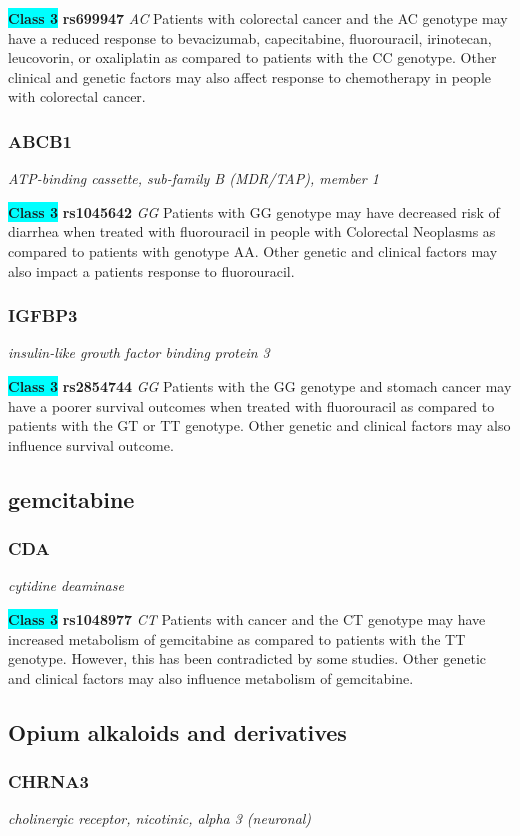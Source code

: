 \documentclass{report}
\begin{document}
\textbf{\colorbox{cyan} {Class 3}} \textbf{ rs699947 } \textit{ AC }
Patients with colorectal cancer and the AC genotype may have a reduced response to bevacizumab, capecitabine, fluorouracil, irinotecan, leucovorin, or oxaliplatin as compared to patients with the CC genotype. Other clinical and genetic factors may also affect response to chemotherapy in people with colorectal cancer.\newline\subsubsection{ ABCB1 }
\textit{ ATP-binding cassette, sub-family B (MDR/TAP), member 1 }

\textbf{\colorbox{cyan} {Class 3}} \textbf{ rs1045642 } \textit{ GG }
Patients with GG genotype may have decreased risk of diarrhea when treated with fluorouracil in people with Colorectal Neoplasms as compared to patients with genotype AA. Other genetic and clinical factors may also impact a patients response to fluorouracil.\newline\subsubsection{ IGFBP3 }
\textit{ insulin-like growth factor binding protein 3 }

\textbf{\colorbox{cyan} {Class 3}} \textbf{ rs2854744 } \textit{ GG }
Patients with the GG genotype and stomach cancer may have a poorer survival outcomes when treated with fluorouracil as compared to patients with the GT or TT genotype. Other genetic and clinical factors may also influence survival outcome.\newline\subsection{ gemcitabine }\subsubsection{ CDA }
\textit{ cytidine deaminase }

\textbf{\colorbox{cyan} {Class 3}} \textbf{ rs1048977 } \textit{ CT }
Patients with cancer and the CT genotype may have increased metabolism of gemcitabine as compared to patients with the TT genotype. However, this has been contradicted by some studies. Other genetic and clinical factors may also influence metabolism of gemcitabine. \newline\subsection{ Opium alkaloids and derivatives }\subsubsection{ CHRNA3 }
\textit{ cholinergic receptor, nicotinic, alpha 3 (neuronal) }
\end{document}
